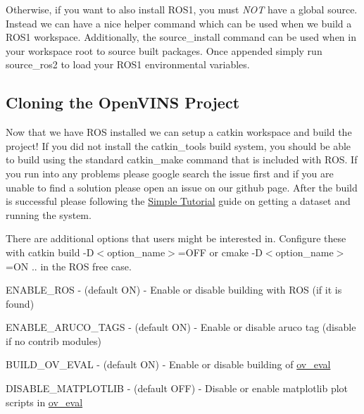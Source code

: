 Otherwise, if you want to also install R\+O\+S1, you must {\itshape N\+OT} have a global source. Instead we can have a nice helper command which can be used when we build a R\+O\+S1 workspace. Additionally, the {\ttfamily source\+\_\+install} command can be used when in your workspace root to source built packages. Once appended simply run {\ttfamily source\+\_\+ros2} to load your R\+O\+S1 environmental variables.


\hypertarget{gs-installing_gs-install-openvins}{}\subsection{Cloning the Open\+V\+I\+N\+S Project}\label{gs-installing_gs-install-openvins}
Now that we have R\+OS installed we can setup a catkin workspace and build the project! If you did not install the catkin\+\_\+tools build system, you should be able to build using the standard {\ttfamily catkin\+\_\+make} command that is included with R\+OS. If you run into any problems please google search the issue first and if you are unable to find a solution please open an issue on our github page. After the build is successful please following the \hyperlink{gs-tutorial}{Simple Tutorial} guide on getting a dataset and running the system.

There are additional options that users might be interested in. Configure these with {\ttfamily catkin build -\/D$<$option\+\_\+name$>$=O\+FF} or {\ttfamily cmake -\/D$<$option\+\_\+name$>$=ON ..} in the R\+OS free case.


\begin{DoxyItemize}
\item {\ttfamily E\+N\+A\+B\+L\+E\+\_\+\+R\+OS} -\/ (default ON) -\/ Enable or disable building with R\+OS (if it is found)
\item {\ttfamily E\+N\+A\+B\+L\+E\+\_\+\+A\+R\+U\+C\+O\+\_\+\+T\+A\+GS} -\/ (default ON) -\/ Enable or disable aruco tag (disable if no contrib modules)
\item {\ttfamily B\+U\+I\+L\+D\+\_\+\+O\+V\+\_\+\+E\+V\+AL} -\/ (default ON) -\/ Enable or disable building of \hyperlink{namespaceov__eval}{ov\+\_\+eval}
\item {\ttfamily D\+I\+S\+A\+B\+L\+E\+\_\+\+M\+A\+T\+P\+L\+O\+T\+L\+IB} -\/ (default O\+FF) -\/ Disable or enable matplotlib plot scripts in \hyperlink{namespaceov__eval}{ov\+\_\+eval}
\end{DoxyItemize}


